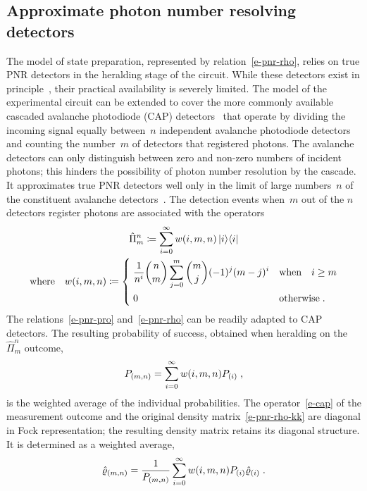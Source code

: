 \documentclass{article}
\begin{document}
\subsection*{Approximate photon number resolving detectors}

The model of state preparation, represented by relation~\eqref{e-pnr-rho}, relies on true PNR detectors in the heralding stage of the circuit. While these detectors exist in principle~\cite{hopker2019,endo2021,endo2024}, their practical availability is severely limited. The model of the experimental circuit can be extended to cover the more commonly available cascaded avalanche photodiode (CAP) detectors~\cite{hlousek2019,grygar2022,hlousek2024,ercolano2024} that operate by dividing the incoming signal equally between~$n$ independent avalanche photodiode detectors and counting the number~$m$ of detectors that registered photons. The avalanche detectors can only distinguish between zero and non-zero numbers of incident photons; this hinders the possibility of photon number resolution by the cascade. It approximates true PNR detectors well only in the limit of large numbers~$n$ of the constituent avalanche detectors~\cite{provaznik2020}. The detection events when~$m$ out of the $n$ detectors register photons are associated with the operators~\cite{paul1996}
%
\begin{equation}\label{e-cap}
  \begin{gathered}
  \hat{\Pi}_{m}^{n} 
    \coloneqq \sum_{i = 0}^{\infty} w(i, m, n) \ketbra{i}{i} \\
  \text{where} \quad
  w(i, m, n) 
    \coloneqq 
    \begin{dcases}
      \; \frac{1}{n^{i}} \binom{n}{m} \sum_{j = 0}^{m} \binom{m}{j} (-1)^{j} (m - j)^{i} 
      & \text{when}\quad i \geq m \\
      \; 0 & \text{otherwise} \Qd
    \end{dcases}
  \end{gathered}
\end{equation} 
%
The relations~\eqref{e-pnr-pro} and~\eqref{e-pnr-rho} can be readily adapted to CAP detectors. The resulting probability of success, obtained when heralding on the~$\hat{\Pi}_{m}^{n}$ outcome, 
%
\begin{equation}\label{e-cap-pro}
  P_{(m, n)} = \sum_{i = 0}^{\infty} w(i, m, n) P_{(i)} \;\text{,}
\end{equation}
%
is the weighted average of the individual probabilities. The operator~\eqref{e-cap} of the measurement outcome and the original density matrix~\eqref{e-pnr-rho-kk} are diagonal in Fock representation; the resulting density matrix retains its diagonal structure. It is determined as a weighted average,
%
\begin{equation}\label{e-cap-rho-kk}
  \hat{\varrho}_{(m, n)} =
    \frac{1}{ P_{(m,n)} }
    \sum_{i = 0}^{\infty} w(i, m, n) P_{(i)} \hat{\varrho}_{(i)}
  \;\text{.}
\end{equation}
\end{document}
